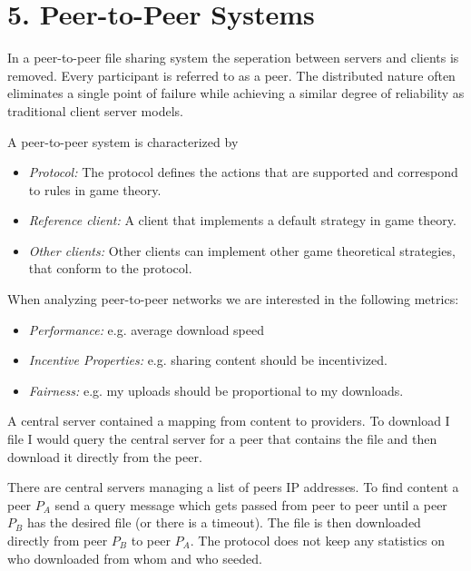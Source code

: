 \documentclass[12pt]{article}
\theoremstyle{definition}
\theoremstyle{remark}
\begin{document}


\section*{5. Peer-to-Peer Systems}

\begin{definition} 
In a peer-to-peer file sharing system the seperation between servers and clients is removed. Every participant is referred to as a peer. The distributed nature often eliminates a single point of failure while achieving a similar degree of reliability as traditional client server models.

A peer-to-peer system is characterized by 
\begin{itemize}
	\item \textit{Protocol:} The protocol defines the actions that are supported and correspond to rules in game theory.
	\item \textit{Reference client:} A client that implements a default strategy in game theory.
	\item \textit{Other clients:} Other clients can implement other game theoretical strategies, that conform to the protocol.
\end{itemize}

When analyzing peer-to-peer networks we are interested in the following metrics:

\begin{itemize}
	\item \textit{Performance:} e.g. average download speed
	\item \textit{Incentive Properties:} e.g. sharing content should be incentivized.
	\item \textit{Fairness:} e.g. my uploads should be proportional to my downloads.
\end{itemize}

\end{definition}

\begin{example}[Napster]
A central server contained a mapping from content to providers. To download I file I would query the central server for a peer that contains the file and then download it directly from the peer.
\end{example}

\begin{example}[Gnutella]
There are central servers managing a list of peers IP addresses. To find content a peer $P_A$ send a query message which gets passed from peer to peer until a peer $P_B$ has the desired file (or there is a timeout). The file is then downloaded directly from peer $P_B$ to peer $P_A$. The protocol does not keep any statistics on who downloaded from whom and who seeded.
\end{example}
\end{document}

